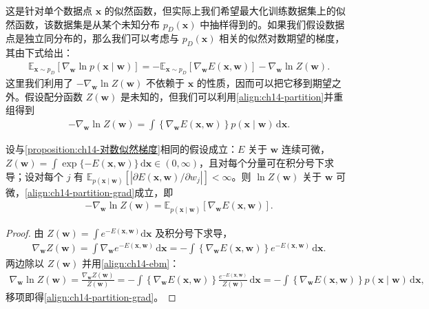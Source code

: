 \documentclass[../../main.tex]{subfiles}
\begin{document}
这是针对单个数据点 $\bm{x}$ 的似然函数，但实际上我们希望最大化训练数据集上的似然函数，该数据集是从某个未知分布 $p_{D}(\bm{x})$ 中抽样得到的。如果我们假设数据点是独立同分布的，那么我们可以考虑与 $p_{D}(\bm{x})$ 相关的似然对数期望的梯度，其由下式给出：
\begin{align}
\mathbb{E}_{\bm{x}\sim p_{D}}\left[\nabla_{\bm{w}}\ln p(\bm{x}\mid\bm{w})\right]=-\mathbb{E}_{\bm{x}\sim p_{D}}\left[\nabla_{\bm{w}}E(\bm{x},\bm{w})\right]-\nabla_{\bm{w}}\ln Z(\bm{w}).
\label{align:ch14-grad-expected}
\end{align}
这里我们利用了 $-\nabla_{\bm{w}}\ln Z(\bm{w})$ 不依赖于 $\bm{x}$ 的性质，因而可以把它移到期望之外。假设配分函数 $Z(\bm{w})$ 是未知的，但我们可以利用\eqref{align:ch14-partition}并重组得到
\begin{align}
-\nabla_{\bm{w}}\ln Z(\bm{w})=\int\left\{\nabla_{\bm{w}}E(\bm{x},\bm{w})\right\}p(\bm{x}\mid\bm{w})\,\mathrm{d}\bm{x}.
\label{align:ch14-partition-grad}
\end{align}

\begin{proposition}[配分函数对数的梯度]\label{proposition:ch14-配分函数梯度}
设与\cref{proposition:ch14-对数似然梯度}相同的假设成立：$E$ 关于 $\bm{w}$ 连续可微，$Z(\bm{w})=\int\exp\{-E(\bm{x},\bm{w})\}\,\mathrm{d}\bm{x}\in(0,\infty)$，且对每个分量可在积分号下求导；设对每个 $j$ 有 $\mathbb{E}_{p(\bm{x}\mid\bm{w})}\left[\left|\partial E(\bm{x},\bm{w})/\partial w_{j}\right|\right]<\infty$。则 $\ln Z(\bm{w})$ 关于 $\bm{w}$ 可微，\eqref{align:ch14-partition-grad}成立，即
\begin{align*}
-\nabla_{\bm{w}}\ln Z(\bm{w})=\mathbb{E}_{p(\bm{x}\mid\bm{w})}\left[\nabla_{\bm{w}}E(\bm{x},\bm{w})\right].
\end{align*}
\end{proposition}

\begin{proof}
由 $Z(\bm{w})=\int e^{-E(\bm{x},\bm{w})}\mathrm{d}\bm{x}$ 及积分号下求导，
\begin{align*}
\nabla_{\bm{w}}Z(\bm{w})=\int\nabla_{\bm{w}}e^{-E(\bm{x},\bm{w})}\,\mathrm{d}\bm{x}=-\int\left\{\nabla_{\bm{w}}E(\bm{x},\bm{w})\right\}e^{-E(\bm{x},\bm{w})}\,\mathrm{d}\bm{x}.
\end{align*}
两边除以 $Z(\bm{w})$ 并用\eqref{align:ch14-ebm}：
\begin{align*}
\nabla_{\bm{w}}\ln Z(\bm{w})=\frac{\nabla_{\bm{w}}Z(\bm{w})}{Z(\bm{w})}=-\int\left\{\nabla_{\bm{w}}E(\bm{x},\bm{w})\right\}\frac{e^{-E(\bm{x},\bm{w})}}{Z(\bm{w})}\,\mathrm{d}\bm{x}=-\int\left\{\nabla_{\bm{w}}E(\bm{x},\bm{w})\right\}p(\bm{x}\mid\bm{w})\,\mathrm{d}\bm{x},
\end{align*}
移项即得\eqref{align:ch14-partition-grad}。
\end{proof}
\end{document}

